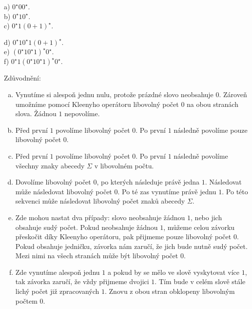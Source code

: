 \begin{multicols}{2}
    a) $0^\star 0 0^\star$.\\
    b) $0^\star 1 0^\star$.\\
    c) $0^\star 1 (0+1)^\star$.
\columnbreak

    d) $0^\star 1 0^\star 1 (0+1)^\star$.\\
    e) $(0^\star 1 0^\star 1)^\star 0^\star$.\\
    f) $0^\star 1 (0^\star 1 0^\star 1)^\star 0^\star$.
\end{multicols}
Zdůvodnění:
\begin{enumerate}[a), noitemsep]
    \item Vynutíme si alespoň jednu nulu, protože prázdné slovo neobsahuje $0$. Zároveň umožníme pomocí Kleenyho 
    operátoru libovolný počet $0$ na obou stranách slova. Žádnou $1$ nepovolíme.
    \item Před první $1$ povolíme libovolný počet $0$. Po první $1$ následně povolíme pouze libovolný počet $0$.
    \item Před první $1$ povolíme libovolný počet $0$. Po první $1$ následně povolíme všechny znaky abecedy 
    $\Sigma$ v libovolném počtu.
    \item Dovolíme libovolný počet $0$, po kterých následuje právě jedna $1$. Následovat může následovat libovolný počet 
    $0$. Po té zas vynutíme právě jednu $1$. Po této sekvenci může následovat libovolný počet znaků abecedy $\Sigma$.
    \item Zde mohou nastat dva případy: slovo neobsahuje žádnou $1$, nebo jich obsahuje sudý počet. Pokud neobsahuje 
    žádnou $1$, můžeme celou závorku přeskočit díky Kleenyho operátoru, pak přijmeme pouze libovolný počet $0$. Pokud 
    obsahuje jedničku, závorka nám zaručí, že jich bude nutně sudý počet. Mezi nimi na všech stranách může být libovolný
    počet $0$.
    \item Zde vynutíme alespoň jednu $1$ a pokud by se mělo ve slově vyskytovat více $1$, tak závorka zaručí, že vždy
    přijmeme dvojici $1$. Tím bude v celém slově stále lichý počet již zpracovaných $1$. Znovu z obou stran obklopeny 
    libovolným počtem $0$.
\end{enumerate}

\newpage %
